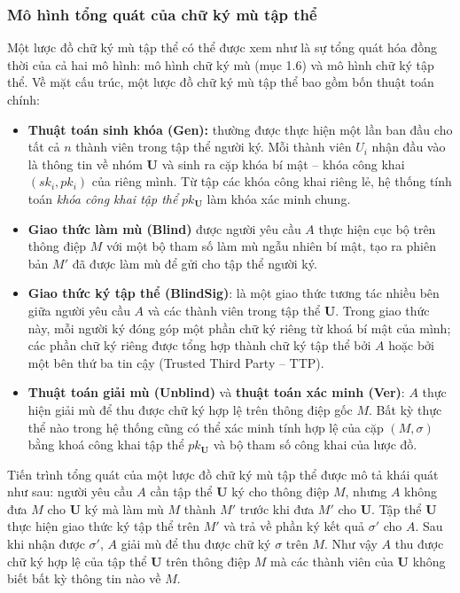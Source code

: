 \subsubsection{Mô hình tổng quát của chữ ký mù tập thể}

Một lược đồ chữ ký mù tập thể có thể được xem như là sự tổng quát hóa đồng thời của cả hai mô hình: mô hình chữ ký mù (mục 1.6) và mô hình chữ ký tập thể. Về mặt cấu trúc, một lược đồ chữ ký mù tập thể bao gồm bốn thuật toán chính:

\begin{itemize}
    \item \textbf{Thuật toán sinh khóa (Gen):} thường được thực hiện một lần ban đầu cho tất cả $n$ thành viên trong tập thể người ký. Mỗi thành viên $U_i$ nhận đầu vào là thông tin về nhóm $\mathbf{U}$ và sinh ra cặp khóa bí mật -- khóa công khai $(sk_i, pk_i)$ của riêng mình. Từ tập các khóa công khai riêng lẻ, hệ thống tính toán \textit{khóa công khai tập thể} $pk_{\mathbf{U}}$ làm khóa xác minh chung.

    \item \textbf{Giao thức làm mù (Blind)} được người yêu cầu $A$ thực hiện cục bộ trên thông điệp $M$ với một bộ tham số làm mù ngẫu nhiên bí mật, tạo ra phiên bản $M'$ đã được làm mù để gửi cho tập thể người ký.

    \item \textbf{Giao thức ký tập thể (BlindSig)}: là một giao thức tương tác nhiều bên giữa người yêu cầu $A$ và các thành viên trong tập thể $\mathbf{U}$. Trong giao thức này, mỗi người ký đóng góp một phần chữ ký riêng từ khoá bí mật của mình; các phần chữ ký riêng được tổng hợp thành chữ ký tập thể bởi $A$ hoặc bởi một bên thứ ba tin cậy (Trusted Third Party -- TTP).

    \item \textbf{Thuật toán giải mù (Unblind)} và \textbf{thuật toán xác minh (Ver)}: $A$ thực hiện giải mù để thu được chữ ký hợp lệ trên thông điệp gốc $M$. Bất kỳ thực thể nào trong hệ thống cũng có thể xác minh tính hợp lệ của cặp $(M, \sigma)$ bằng khoá công khai tập thể $pk_{\mathbf{U}}$ và bộ tham số công khai của lược đồ.
\end{itemize}

Tiến trình tổng quát của một lược đồ chữ ký mù tập thể được mô tả khái quát như sau: người yêu cầu $A$ cần tập thể $\mathbf{U}$ ký cho thông điệp $M$, nhưng $A$ không đưa $M$ cho $\mathbf{U}$ ký mà làm mù $M$ thành $M'$ trước khi đưa $M'$ cho $\mathbf{U}$. Tập thể $\mathbf{U}$ thực hiện giao thức ký tập thể trên $M'$ và trả về phần ký kết quả $\sigma'$ cho $A$. Sau khi nhận được $\sigma'$, $A$ giải mù để thu được chữ ký $\sigma$ trên $M$. Như vậy $A$ thu được chữ ký hợp lệ của tập thể $\mathbf{U}$ trên thông điệp $M$ mà các thành viên của $\mathbf{U}$ không biết bất kỳ thông tin nào về $M$.

